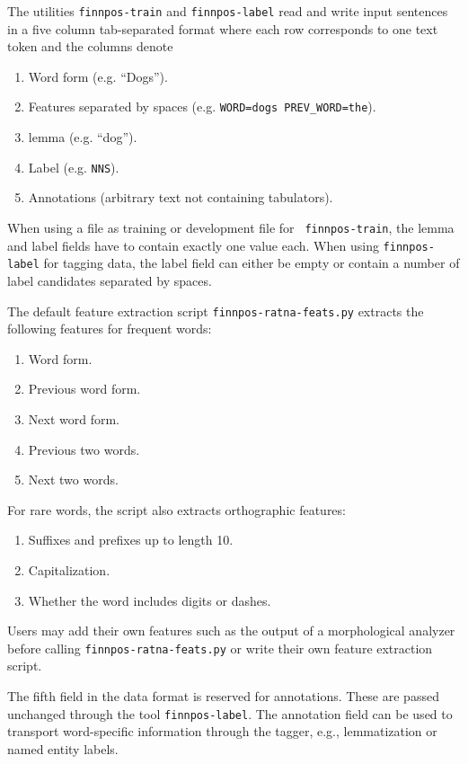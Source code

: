 \documentclass{llncs}
\begin{document}
The utilities {\tt finnpos-train} and {\tt finnpos-label} read and write input
sentences in a five column tab-separated format where each row
corresponds to one text token and the columns denote

\begin{enumerate}
  \item  Word form (e.g. ``Dogs'').
  \item  Features separated by spaces (e.g. \verb|WORD=dogs PREV_WORD=the|).
  \item  lemma (e.g. ``dog'').
  \item  Label (e.g. \verb|NNS|).
  \item  Annotations (arbitrary text not containing tabulators).
\end{enumerate}

When using a file as training or development file for {\tt
  finnpos-train}, the lemma and label fields have to contain exactly
one value each. When using {\tt finnpos-label} for tagging data, the
label field can either be empty or contain a number of label
candidates separated by spaces. 

The default feature extraction script {\tt finnpos-ratna-feats.py}
extracts the following features for frequent words:

\begin{enumerate}
\item Word form.
\item Previous word form.
\item Next word form.
\item Previous two words.
\item Next two words.
\end{enumerate}

\noindent For rare words, the script also extracts orthographic features:

\begin{enumerate}
\item Suffixes and prefixes up to length 10.
\item Capitalization.
\item Whether the word includes digits or dashes.
\end{enumerate}

\noindent Users may add their own features such as the output of a
morphological analyzer before calling {\tt finnpos-ratna-feats.py} or
write their own feature extraction script.

The fifth field in the data format is reserved for annotations. These
are passed unchanged through the tool {\tt finnpos-label}. The
annotation field can be used to transport word-specific information
through the tagger, e.g., lemmatization or named entity labels.
\end{document}
